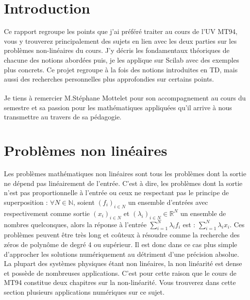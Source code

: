 \section*{Introduction}
   Ce rapport regroupe les points que j'ai préféré traiter au cours de l'UV MT94, vous y trouverez principalement des sujets en lien avec les deux parties sur les problèmes non-linéaires du cours. J'y décris les fondamentaux théoriques de chacune des notions abordées puis, je les applique sur Scilab avec des exemples plus concrets. Ce projet regroupe à la fois des notions introduites en TD, mais aussi des recherches personnelles plus approfondies sur certains points. \\\\
   Je tiens à remercier M.Stéphane Mottelet pour son accompagnement au cours du semestre et sa passion pour les mathématiques appliquées qu'il arrive à nous transmettre au travers de sa pédagogie.
      
    \newpage
 \section*{Problèmes non linéaires}
      Les problèmes mathématiques non linéaires sont tous les problèmes dont la sortie ne dépend pas linéairement de l'entrée. C'est à dire, les problèmes dont la sortie n'est pas proportionnelle à l'entrée ou ceux ne respectant pas le principe de superposition : 
      $\forall N \in \mathbb{N}$, soient $(f_i)_{i\in N}$ un ensemble d'entrées avec respectivement comme sortie $(x_i)_{i\in N}$ et $(\lambda_i)_{i\in N} \in \mathbb{R}^N$ un ensemble de nombres quelconques, alors la réponse à l'entrée $\sum_{i=1}^N \lambda_i f_i $ est : $ \sum_{i=1}^N \lambda_i x_i$. Ces problèmes peuvent être très long et coûteux à résoudre comme la recherche des zéros de polynôme de degré 4 ou supérieur. Il est donc dans ce cas plus simple d'approcher les solutions numériquement au détriment d'une précision absolue. La plupart des systèmes physiques étant non linéaires, la non linéarité est dense et possède de nombreuses applications. C'est pour cette raison que le cours de MT94 constitue deux chapitres sur la non-linéarité. Vous trouverez dans cette section plusieurs applications numériques sur ce sujet.
